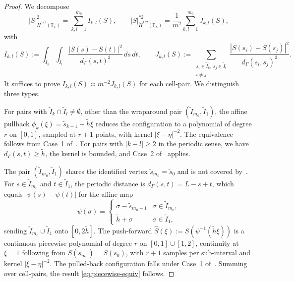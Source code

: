 \documentclass[11pt]{article}
\begin{document}
\begin{proof} We decompose
\begin{equation*}
  |S|^2_{\dot{H}^{1/2}(\mathbb{T}_L)}
  = \sum_{k,l=1}^{m_0} I_{k,l}(S),
  \qquad
  |S|^{*2}_{\dot{H}^{1/2}(\mathbb{T}_L)}
  = \frac{1}{m^2} \sum_{k,l=1}^{m_0} J_{k,l}(S),
\end{equation*}
with
\begin{equation*}
  I_{k,l}(S) := \int_{\tilde{I}_k}\!\int_{\tilde{I}_l}
    \frac{|S(s)-S(t)|^2}{d_\Gamma(s,t)^2}\,ds\,dt,
  \qquad
  J_{k,l}(S) := \sum_{\substack{s_i \in \tilde{I}_k,\, s_j \in \tilde{I}_l \\ i \ne j}}
    \frac{|S(s_i)-S(s_j)|^2}{d_\Gamma(s_i,s_j)^2}.
\end{equation*}
It suffices to
prove $I_{k,l}(S) \asymp m^{-2} J_{k,l}(S)$ for each cell-pair. We distinguish three types.

For pairs with $\tilde{I}_k \cap \tilde{I}_l \ne \emptyset$, other
than the wraparound pair $(\tilde{I}_{m_0}, \tilde{I}_1)$, the affine pullback $\phi_k(\xi) = \tilde{s}_{k-1} + \tilde{h}\xi$ reduces the
configuration to a polynomial of degree $r$ on $[0,1]$, sampled at
$r+1$ points, with kernel $|\xi - \eta|^{-2}$. The equivalence
follows from Case~1 of~\cite[Lemma~6.2]{bonito2025}. For pairs with $|k - l| \ge 2$ in the periodic sense, we have
$d_\Gamma(s, t) \ge \tilde{h}$, the kernel is bounded, and Case~2
of~\cite[Lemma~6.2]{bonito2025} applies.

The pair $(\tilde{I}_{m_0}, \tilde{I}_1)$ shares the identified
vertex $\tilde{s}_{m_0} = \tilde{s}_0$ and is not covered
by~\cite{bonito2025}. For $s \in \tilde{I}_{m_0}$ and
$t \in \tilde{I}_1$, the periodic distance is $d_\Gamma(s,t) = L - s + t$,
which equals $|\psi(s) - \psi(t)|$ for the affine map
\begin{equation*}
  \psi(\sigma) = \begin{cases}
    \sigma - \tilde{s}_{m_0-1} & \sigma \in \tilde{I}_{m_0}, \\
    \tilde{h} + \sigma & \sigma \in \tilde{I}_1,
  \end{cases}
\end{equation*}
sending $\tilde{I}_{m_0} \cup \tilde{I}_1$ onto $[0, 2\tilde{h}]$. The push-forward
$\hat{S}(\xi) := S(\psi^{-1}(\tilde{h}\xi))$ is a continuous
piecewise polynomial of degree $r$ on $[0,1] \cup [1,2]$,
continuity at $\xi = 1$ following from $S(\tilde{s}_{m_0}) =
S(\tilde{s}_0)$, with $r+1$ samples per sub-interval and kernel
$|\xi - \eta|^{-2}$. The pulled-back configuration falls under
Case~1 of~\cite[Lemma~6.2]{bonito2025}.
Summing over cell-pairs, the result \eqref{eq:piecewise-equiv} follows.
\end{proof}
\end{document}
